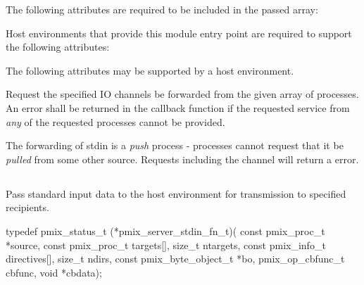 \reqattrstart
The following attributes are required to be included in the passed  array:


\divider

Host environments that provide this module entry point are required to support the following attributes:


\reqattrend

\optattrstart
The following attributes may be supported by a host environment.


\optattrend

\descr

Request the specified IO channels be forwarded from the given array of processes. An error shall be returned in the callback function if the requested service from \textit{any} of the requested processes cannot be provided.

\adviceimplstart
The forwarding of stdin is a \textit{push} process - processes cannot request that it be \textit{pulled} from some other source. Requests including the  channel will return a  error.
\adviceimplend


\subsection{}

\summary

Pass standard input data to the host environment for transmission to specified recipients.

\format

\cspecificstart
\begin{codepar}
typedef pmix_status_t (*pmix_server_stdin_fn_t)(
                           const pmix_proc_t *source,
                           const pmix_proc_t targets[],
                           size_t ntargets,
                           const pmix_info_t directives[],
                           size_t ndirs,
                           const pmix_byte_object_t *bo,
                           pmix_op_cbfunc_t cbfunc, void *cbdata);
\end{codepar}
\cspecificend

